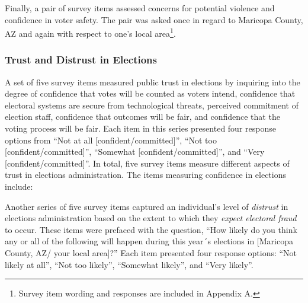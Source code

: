 \documentclass[
  12pt,
  letterpaper,
]{article}
\begin{document}
Finally, a pair of survey items assessed concerns for potential violence
and confidence in voter safety. The pair was asked once in regard to
Maricopa County, AZ and again with respect to one's local
area\footnote{Survey item wording and responses are included in Appendix
  A.}.

\subsubsection{Trust and Distrust in
Elections}\label{trust-and-distrust-in-elections}

A set of five survey items measured public trust in elections by
inquiring into the degree of confidence that votes will be counted as
voters intend, confidence that electoral systems are secure from
technological threats, perceived commitment of election staff,
confidence that outcomes will be fair, and confidence that the voting
process will be fair. Each item in this series presented four response
options from ``Not at all {[}confident/committed{]}'', ``Not too
{[}confident/committed{]}'', ``Somewhat {[}confident/committed{]}'', and
``Very {[}confident/committed{]}''. In total, five survey items measure
different aspects of trust in elections administration. The items
measuring confidence in elections include:

Another series of five survey items captured an individual's level of
\emph{distrust} in elections administration based on the extent to which
they \emph{expect electoral fraud} to occur. These items were prefaced
with the question, ``How likely do you think any or all of the following
will happen during this year´s elections in {[}Maricopa County, AZ/ your
local area{]}?'' Each item presented four response options: ``Not likely
at all'', ``Not too likely'', ``Somewhat likely'', and ``Very likely''.
\end{document}
